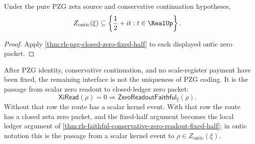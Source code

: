 \begin{corollary}
\label{cor:rh-ontic-zeta-zeros-fixed-half-line}
Under the pure PZG zeta source and conservative continuation hypotheses,
$$
Z_{\mathrm{ontic}}(\xi)
\subseteq
\left\{\frac12+it:t\in\RealUp\right\}.
$$
\end{corollary}

\begin{proof}
Apply \autoref{thm:rh-pzg-closed-zero-fixed-half} to each displayed
ontic zero packet.
\end{proof}

\begin{principle}
\label{prin:rh-zero-readout-faithfulness-remaining-interface}
After PZG identity, conservative continuation, and no scale-register
payment have been fixed, the remaining interface is not the uniqueness of
PZG coding.  It is the passage from scalar zero readout to closed-ledger
zero packet:
$$
\mathsf{XiRead}(\rho)=0
\Longrightarrow
\mathsf{ZeroReadoutFaithful}_{\xi}(\rho).
$$
Without that row the route has a scalar kernel event.  With that row the
route has a closed zeta zero packet, and the fixed-half argument becomes
the local ledger argument of
\autoref{thm:rh-faithful-conservative-zero-readout-fixed-half}; in
ontic notation this is the passage from a scalar kernel event to
$\rho\in Z_{\mathrm{ontic}}(\xi)$.
\end{principle}
